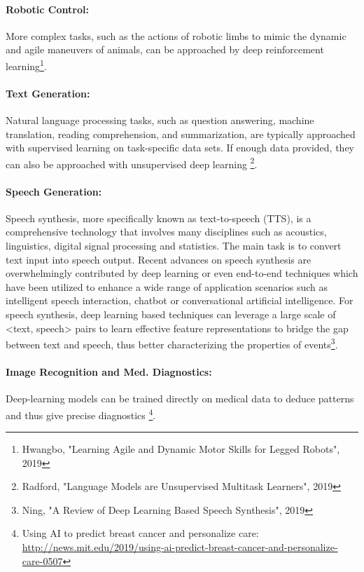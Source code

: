 \documentclass[main]{subfiles}
\begin{document}
\paragraph{Robotic Control:}
More complex tasks, such as the actions of robotic limbs to mimic the dynamic and agile maneuvers of animals, can be approached by deep reinforcement learning\footnote{Hwangbo, "Learning Agile and Dynamic Motor Skills for Legged Robots", 2019}. 

\paragraph{Text Generation:}
Natural language processing tasks, such as question answering, machine translation, reading comprehension, and summarization, are typically approached with supervised learning on task-specific data sets. If enough data provided, they can also be approached with unsupervised deep learning \footnote{Radford, "Language Models are Unsupervised Multitask Learners", 2019}.

\paragraph{Speech Generation:}
Speech synthesis, more specifically known as text-to-speech (TTS), is a comprehensive technology that involves many disciplines such as acoustics, linguistics, digital signal processing and statistics. The main task is to convert text input into speech output.  Recent advances on speech synthesis are overwhelmingly contributed by deep learning or even end-to-end techniques which have been utilized to enhance a wide range of application scenarios such as intelligent speech interaction, chatbot or conversational artificial intelligence. For speech synthesis, deep learning based techniques can leverage a large scale of <text, speech> pairs to learn effective feature representations to bridge the gap between text and speech, thus better characterizing the properties of events\footnote{Ning, "A Review of Deep Learning Based Speech Synthesis", 2019}.

\paragraph{Image Recognition and Med. Diagnostics:}
Deep-learning models can be trained directly on medical data to deduce patterns and thus give precise diagnostics \footnote{Using AI to predict breast cancer and personalize care: \url{http://news.mit.edu/2019/using-ai-predict-breast-cancer-and-personalize-care-0507}}.
\end{document}
